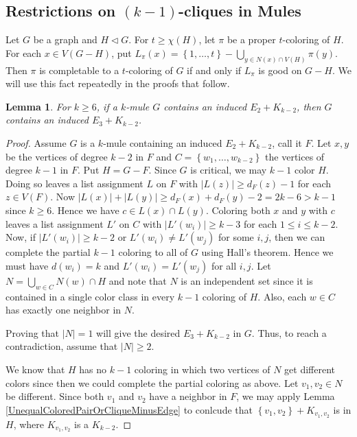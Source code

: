 \documentclass[12pt]{article}
\theoremstyle{plain}
\newtheorem{lem}[thm]{Lemma}
\theoremstyle{definition}
\theoremstyle{remark}
\newcommand{\set}[1]{\left\{ #1 \right\}}
\newcommand{\card}[1]{\left|#1\right|}
\begin{document}
\subsection{Restrictions on $(k-1)$-cliques in Mules}
Let $G$ be a graph and $H \lhd G$.  For $t \geq \chi(H)$, let $\pi$ be a proper $t$-coloring of $H$.  For each $x \in V(G-H)$, put $L_{\pi}(x) = \set{1, \ldots, t} - \bigcup_{y \in N(x) \cap V(H)} \pi(y)$.  Then $\pi$ is completable to a $t$-coloring of $G$ if and only if $L_{\pi}$ is good on $G-H$.  We will use this fact repeatedly in the proofs that follow.

\begin{lem}\label{E2impliesE3}
For $k \geq 6$, if a $k$-mule $G$ contains an induced $E_2 + K_{k - 2}$, then $G$ contains an induced $E_3 + K_{k - 2}$.
\end{lem}
\begin{proof}
Assume $G$ is a $k$-mule containing an induced $E_2 + K_{k - 2}$, call it $F$.  Let $x, y$ be the vertices of degree $k-2$ in $F$ and $C = \set{w_1, \ldots, w_{k-2}}$ the vertices of degree $k-1$ in $F$.  Put $H = G - F$.  Since $G$ is critical, we may $k-1$ color $H$.  Doing so leaves a list assignment $L$ on $F$ with $\card{L(z)} \geq d_F(z) - 1$ for each $z \in V(F)$.  Now $\card{L(x)} + \card{L(y)} \geq d_F(x) + d_F(y) - 2 = 2k - 6 > k - 1$ since $k \geq 6$.  Hence we have $c \in L(x) \cap L(y)$.  Coloring both $x$ and $y$ with $c$ leaves a list assignment $L'$ on $C$ with $\card{L'(w_i)} \geq k - 3$ for each $1 \leq i \leq k-2$.  Now, if $\card{L'(w_i)} \geq k - 2$ or $L'(w_i) \neq L'(w_j)$ for some $i, j$, then we can complete the partial $k-1$ coloring to all of $G$ using Hall's theorem.  Hence we must have $d(w_i) = k$ and $L'(w_i) = L'(w_j)$ for all $i,j$.  Let $N = \bigcup_{w \in C} N(w) \cap H$ and note that $N$ is an independent set since it is contained in a single color class in every $k-1$ coloring of $H$.  Also, each $w \in C$ has exactly one neighbor in $N$.\newline

Proving that $\card{N} = 1$ will give the desired $E_3 + K_{k - 2}$ in $G$.  Thus, to reach a contradiction, assume that $\card{N} \geq 2$.\newline  

We know that $H$ has no $k-1$ coloring in which two vertices of $N$ get different colors since then we could complete the partial coloring as above. Let $v_1, v_2 \in N$ be different. Since both $v_1$ and $v_2$ have a neighbor in $F$, we may apply Lemma \ref{UnequalColoredPairOrCliqueMinusEdge} to conlcude that $\set{v_1, v_2} + K_{v_1, v_2}$ is in $H$, where $K_{v_1, v_2}$ is a $K_{k-2}$. \newline


\end{proof}
\end{document}
